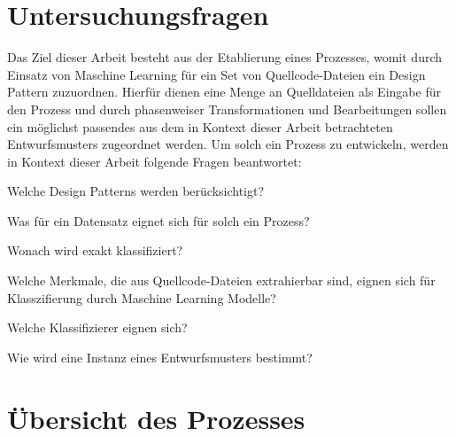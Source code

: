 \newpage

\section{Untersuchungsfragen}

Das Ziel dieser Arbeit besteht aus der Etablierung eines Prozesses, womit durch Einsatz von Maschine Learning für ein Set von Quellcode-Dateien ein Design Pattern zuzuordnen.
Hierfür dienen eine Menge an Quelldateien als Eingabe für den Prozess und durch phasenweiser Transformationen und Bearbeitungen sollen ein möglichst passendes aus dem in Kontext dieser Arbeit betrachteten Entwurfsmusters zugeordnet werden.
Um solch ein Prozess zu entwickeln, werden in Kontext dieser Arbeit folgende Fragen beantwortet:

\begin{questions}
    \item Welche Design Patterns werden berücksichtigt?
    \item\label{RQ2} Was für ein Datensatz eignet sich für solch ein Prozess?
    \item\label{RQ3} Wonach wird exakt klassifiziert?
    \item\label{RQ4} Welche Merkmale, die aus Quellcode-Dateien extrahierbar sind, eignen sich für Klasszifierung durch Maschine Learning Modelle?  
    \item\label{RQ5} Welche Klassifizierer eignen sich?
    \item\label{RQ6} Wie wird eine Instanz eines Entwurfsmusters bestimmt?
\end{questions}

\section{Übersicht des Prozesses}


